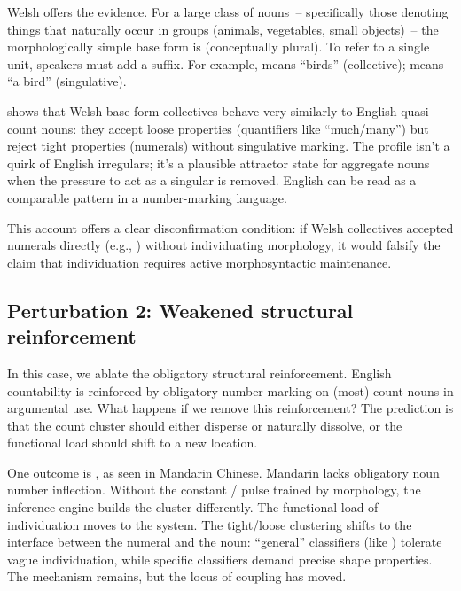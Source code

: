Welsh offers the evidence. For a large class of nouns~-- specifically those denoting things that naturally occur in groups (animals, vegetables, small objects)~-- the morphologically simple base form is  (conceptually plural). To refer to a single unit, speakers must add a  suffix. For example,  means \enquote{birds} (collective);  means \enquote{a bird} (singulative).

\textcite[532]{grimm2018} shows that Welsh base-form collectives behave very similarly to English quasi-count nouns: they accept loose properties (quantifiers like  \enquote{much/many}) but reject tight properties (numerals) without singulative marking. The  profile isn't a quirk of English irregulars; it's a plausible attractor state for aggregate nouns when the pressure to act as a singular is removed. English  can be read as a comparable pattern in a number-marking language.

This account offers a clear disconfirmation condition: if Welsh collectives accepted numerals directly (e.g., ) without individuating morphology, it would falsify the claim that individuation requires active morphosyntactic maintenance.

\subsection{Perturbation 2: Weakened structural reinforcement}
\label{sec:9:weakened-reinforcement}

In this case, we ablate the obligatory structural reinforcement. English countability is reinforced by obligatory number marking on (most) count nouns in argumental use. What happens if we remove this reinforcement? The prediction is that the count cluster should either disperse or naturally dissolve, or the functional load should shift to a new location.

One outcome is , as seen in Mandarin Chinese. Mandarin lacks obligatory noun number inflection. Without the constant / pulse trained by morphology, the inference engine builds the cluster differently. The functional load of individuation moves to the  system. The tight/loose clustering shifts to the interface between the numeral and the noun: \enquote{general} classifiers (like ) tolerate vague individuation, while specific classifiers demand precise shape properties. The mechanism remains, but the locus of coupling has moved.

